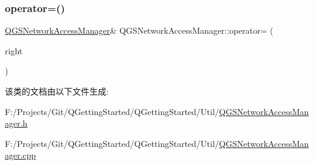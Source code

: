 \subsubsection{\texorpdfstring{operator=()}{operator=()}\hspace{0.1cm}{\footnotesize\ttfamily [2/2]}}
{\footnotesize\ttfamily \mbox{\hyperlink{class_q_g_s_network_access_manager}{Q\+G\+S\+Network\+Access\+Manager}}\& Q\+G\+S\+Network\+Access\+Manager\+::operator= (\begin{DoxyParamCaption}\item[{\mbox{\hyperlink{class_q_g_s_network_access_manager}{Q\+G\+S\+Network\+Access\+Manager}} \&\&}]{right }\end{DoxyParamCaption})\hspace{0.3cm}{\ttfamily [delete]}}



该类的文档由以下文件生成\+:\begin{DoxyCompactItemize}
\item 
F\+:/\+Projects/\+Git/\+Q\+Getting\+Started/\+Q\+Getting\+Started/\+Util/\mbox{\hyperlink{_q_g_s_network_access_manager_8h}{Q\+G\+S\+Network\+Access\+Manager.\+h}}\item 
F\+:/\+Projects/\+Git/\+Q\+Getting\+Started/\+Q\+Getting\+Started/\+Util/\mbox{\hyperlink{_q_g_s_network_access_manager_8cpp}{Q\+G\+S\+Network\+Access\+Manager.\+cpp}}\end{DoxyCompactItemize}
